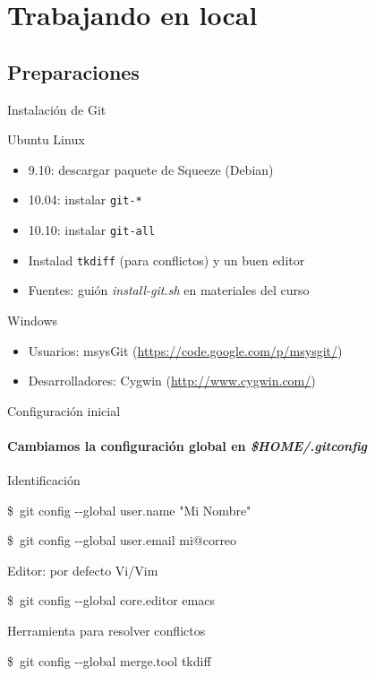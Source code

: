 \documentclass[compress,xcolor=svgnames]{beamer}
\newcommand*{\paquete}[1]{\texttt{#1}}
\newcommand*{\fichero}[1]{\textit{#1}}
\newcommand*{\orden}[1]{
  {\small\ttfamily\$~\nohyphens{#1}\\}}
\begin{document}
\section[Local]{Trabajando en local}

\subsection{Preparaciones}

\begin{frame}{Instalación de Git}
  \begin{block}{Ubuntu Linux}
    \begin{itemize}
    \item 9.10: descargar paquete de Squeeze (Debian)
    \item 10.04: instalar \paquete{git-*}
    \item 10.10: instalar \paquete{git-all}
    \item Instalad \paquete{tkdiff} (para conflictos) y un buen editor
    \item Fuentes: guión \fichero{install-git.sh} en materiales del curso
    \end{itemize}
  \end{block}

  \begin{block}{Windows}
    \begin{itemize}
    \item Usuarios: msysGit (\url{https://code.google.com/p/msysgit/})
    \item Desarrolladores: Cygwin (\url{http://www.cygwin.com/})
    \end{itemize}
  \end{block}
\end{frame}

\begin{frame}{Configuración inicial}
  \framesubtitle{Cambiamos la configuración global en \fichero{\$HOME/.gitconfig}}

  \begin{block}{Identificación}
    \orden{git config {-}-global user.name "Mi Nombre"}
    \orden{git config {-}-global user.email mi@correo}
  \end{block}

  \begin{block}{Editor: por defecto Vi/Vim}
    \orden{git config {-}-global core.editor emacs}
  \end{block}

  \begin{block}{Herramienta para resolver conflictos}
    \orden{git config {-}-global merge.tool tkdiff}
  \end{block}

\end{frame}
\end{document}
